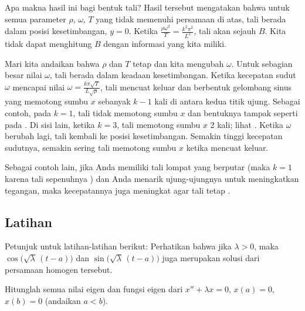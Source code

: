 Apa makna hasil ini bagi bentuk tali?  Hasil tersebut mengatakan bahwa untuk
semua parameter $\rho$, $\omega$, $T$ yang tidak memenuhi persamaan di atas, tali
berada dalam posisi kesetimbangan, $y=0$.  Ketika
$\frac{\rho \omega^2}{T} = \frac{k^2 \pi^2}{L^2}$, tali akan
 sejauh $B$.  Kita tidak dapat menghitung $B$
dengan informasi yang kita miliki.

Mari kita andaikan bahwa $\rho$ dan $T$ tetap dan kita mengubah $\omega$.
Untuk sebagian besar nilai $\omega$, tali berada dalam keadaan kesetimbangan.  Ketika
kecepatan sudut $\omega$ mencapai nilai
$\omega = \frac{k \pi \sqrt{T}}{L\sqrt{\rho}}$, tali
mencuat keluar dan berbentuk gelombang sinus yang memotong
sumbu $x$ sebanyak $k-1$ kali di antara kedua titik ujung.
Sebagai contoh, pada $k=1$, tali tidak memotong sumbu $x$
dan bentuknya tampak seperti pada .
Di sisi lain, ketika $k=3$, tali memotong sumbu $x$
2 kali; lihat .
Ketika $\omega$ berubah lagi, tali kembali ke
posisi kesetimbangan.  Semakin tinggi kecepatan sudutnya,
semakin sering tali memotong sumbu $x$ ketika mencuat keluar.

\begin{myfig}
\capstart
{}
\caption{Tali berputar pada nilai eigen ketiga ($k=3$).\label{bvp:whirstring2fig}}
\end{myfig}

Sebagai contoh lain, jika Anda memiliki tali lompat yang berputar (maka $k=1$ karena tali
sepenuhnya ) dan Anda
menarik ujung-ujungnya untuk meningkatkan tegangan, maka kecepatannya juga meningkat
agar tali tetap .


\subsection{Latihan}

Petunjuk untuk latihan-latihan berikut: Perhatikan bahwa
jika $\lambda > 0$, maka
$\cos \bigl( \sqrt{\lambda}\, (t - a) \bigr)$
dan $\sin  \bigl( \sqrt{\lambda}\, (t - a) \bigr)$
juga merupakan solusi dari persamaan homogen
tersebut.

\begin{exercise}
Hitunglah semua
nilai eigen dan fungsi eigen dari
$x'' + \lambda x = 0$, $x(a) = 0$, $x(b) = 0$ (andaikan $a < b$).
\end{exercise}

